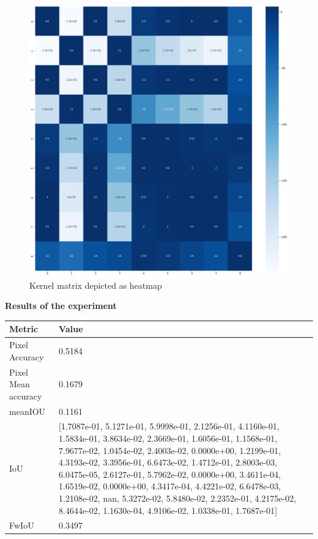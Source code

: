 	\begin{figure}
		\centering
		\includegraphics[width=12cm]{images/unordered_K.png}
		\caption{Kernel matrix depicted as heatmap}
		\label{fig:unordered set of K}
	\end{figure}

    { \bf Results of the experiment}
    
    \begin{center}
    	\begin{tabular}{ | l | p{12cm} |}
    		\hline
    		
    		\cellcolor{purple!30}Metric & \cellcolor{purple!30}Value \\ \hline
    		Pixel Accuracy & 0.5184 \\ \hline
    		Pixel Mean accuracy & 0.1679  \\ \hline
    		meanIOU & 0.1161 \\ \hline
    		IoU & [1.7087e-01, 5.1271e-01, 5.9998e-01, 2.1256e-01, 4.1160e-01, 1.5834e-01,
    		3.8634e-02, 2.3669e-01, 1.6056e-01, 1.1568e-01, 7.9677e-02, 1.0454e-02,
    		2.4003e-02, 0.0000e+00, 1.2199e-01, 4.3193e-02, 3.3956e-01, 6.6473e-02,
    		1.4712e-01, 2.8003e-03, 6.0475e-05, 2.6127e-01, 5.7962e-02, 0.0000e+00,
    		3.4611e-04, 1.6519e-02, 0.0000e+00, 4.3417e-04, 4.4221e-02, 6.6478e-03,
    		1.2108e-02,        nan, 5.3272e-02, 5.8480e-02, 2.2352e-01, 4.2175e-02,
    		8.4644e-02, 1.1630e-04, 4.9106e-02, 1.0338e-01, 1.7687e-01] \\ \hline
    		FwIoU & 0.3497 \\ \hline
    		\hline
    	\end{tabular}
    \end{center}
	
